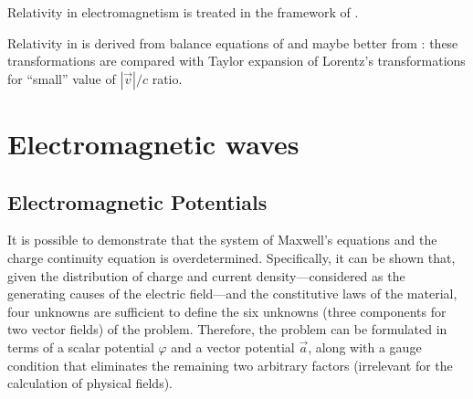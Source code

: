 \documentclass[letterpaper,10pt,english]{jupyterBook}
\begin{document}
\sphinxAtStartPar
Relativity in electromagnetism is treated in the framework of .

\sphinxAtStartPar
Relativity in  is derived from balance equations of {\hyperref[\detokenize{ch/principles-vacuum:classical-electromagnetism-principles-integral-arbitrary-volume}]{}} and \sphinxhyphen{} maybe better \sphinxhyphen{} from {\hyperref[\detokenize{ch/principles-matter:classical-electromagnetism-media-integral-arbitrary-volume}]{}}: these transformations are compared with Taylor expansion of Lorentz’s transformations for “small” value of \(|\vec{v}|/c\) ratio.

\sphinxstepscope




\chapter{Electromagnetic waves}
\label{\detokenize{ch/waves:electromagnetic-waves}}\label{\detokenize{ch/waves:classical-electromagnetism-waves}}\label{\detokenize{ch/waves::doc}}
\sphinxstepscope




\section{Electromagnetic Potentials}
\label{\detokenize{ch/potentials:electromagnetic-potentials}}\label{\detokenize{ch/potentials:classical-electromagnetism-potentials}}\label{\detokenize{ch/potentials::doc}}
\sphinxAtStartPar
It is possible to demonstrate that the system of Maxwell’s equations and the charge continuity equation is overdetermined. Specifically, it can be shown that, given the distribution of charge and current density—considered as the generating causes of the electric field—and the constitutive laws of the material, four unknowns are sufficient to define the six unknowns (three components for two vector fields) of the problem. Therefore, the problem can be formulated in terms of a scalar potential \(\varphi\) and a vector potential \(\vec{a}\), along with a gauge condition that eliminates the remaining two arbitrary factors (irrelevant for the calculation of physical fields).
\end{document}
